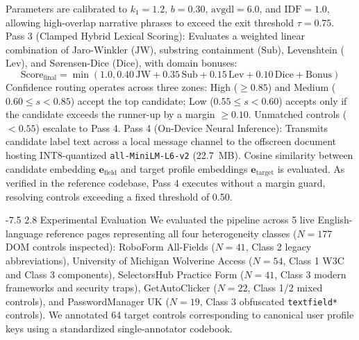 \documentclass[runningheads,a4paper]{llncs}
\makeatletter
\renewcommand\section{\@startsection{section}{1}{\z@}%
  {-7.5\p@ \@plus -2\p@ \@minus -1\p@}%
  {2.8\p@ \@plus 1\p@}%
  {\normalfont\large\bfseries}}
\makeatother
\begin{document}
Parameters are calibrated to $k_1 = 1.2$, $b = 0.30$, $\text{avgdl} = 6.0$, and $\text{IDF} = 1.0$, allowing high-overlap narrative phrases to exceed the exit threshold $\tau = 0.75$.
Pass 3 (Clamped Hybrid Lexical Scoring): Evaluates a weighted linear combination of Jaro-Winkler ($\text{JW}$), substring containment ($\text{Sub}$), Levenshtein ($\text{Lev}$), and S{\o}rensen-Dice ($\text{Dice}$), with domain bonuses:
\begin{equation}
\text{Score}_{\text{final}} = \min\left(1.0, 0.40\,\text{JW} + 0.35\,\text{Sub} + 0.15\,\text{Lev} + 0.10\,\text{Dice} + \text{Bonus}\right)
\end{equation}
Confidence routing operates across three zones: High ($\ge 0.85$) and Medium ($0.60 \le s < 0.85$) accept the top candidate; Low ($0.55 \le s < 0.60$) accepts only if the candidate exceeds the runner-up by a margin $\ge 0.10$. Unmatched controls ($<0.55$) escalate to Pass 4.
Pass 4 (On-Device Neural Inference): Transmits candidate label text across a local message channel to the offscreen document hosting INT8-quantized \texttt{all-MiniLM-L6-v2} (22.7~MB). Cosine similarity between candidate embedding $\mathbf{e}_{\text{field}}$ and target profile embeddings $\mathbf{e}_{\text{target}}$ is evaluated. As verified in the reference codebase, Pass 4 executes without a margin guard, resolving controls exceeding a fixed threshold of 0.50.

\section{Experimental Evaluation}
We evaluated the pipeline across 5 live English-language reference pages representing all four heterogeneity classes ($N = 177$ DOM controls inspected): RoboForm All-Fields ($N = 41$, Class 2 legacy abbreviations), University of Michigan Wolverine Access ($N = 54$, Class 1 W3C and Class 3 components), SelectorsHub Practice Form ($N = 41$, Class 3 modern frameworks and security traps), GetAutoClicker ($N = 22$, Class 1/2 mixed controls), and PasswordManager UK ($N = 19$, Class 3 obfuscated \texttt{textfield*} controls). We annotated 64 target controls corresponding to canonical user profile keys using a standardized single-annotator codebook.
\end{document}
